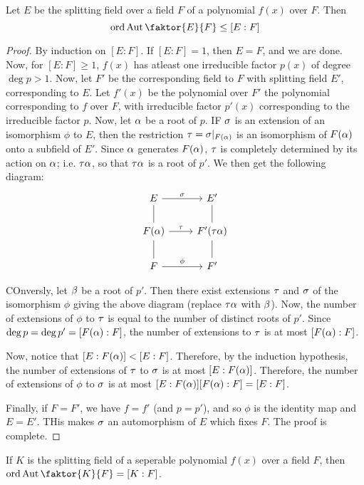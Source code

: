 \begin{proposition}\label{2.1.5}
    Let $E$ be the splitting field over a field $F$ of a polynomial $f(x)$ over
    $F$. Then
    \begin{equation*}
        \ord{\Aut{\faktor{E}{F}}} \leq [E:F]
    \end{equation*}
\end{proposition}
\begin{proof}
    By induction on $[E:F]$. If $[E:F]=1$, then $E=F$, and we are done. Now, for
     $[E:F] \geq 1$, $f(x)$ has atleast one irreducible factor $p(x)$ of degree
     $\deg{p}>1$. Now, let $F'$ be the corresponding field to $F$ with splitting
     field $E'$, corresponding to  $E$. Let  $f'(x)$ be the polynomial over $F'$
     the polynomial corresponding to $f$ over $F$, with irreducible factor
     $p'(x)$ corresponding to the irreducible factor $p$. Now, let  $\alpha$ be a
     root of  $p$. IF  $\sigma$ is an extension of an isomorphism $\phi$ to $E$,
     then the restriction $\tau=\sigma|_{F(\alpha)}$ is an isomorphism of $F(\alpha)$ onto a
     subfield of $E'$. Since $\alpha$ generates $F(\alpha)$, $\tau$ is completely
     determined by its action on  $\alpha$; i.e.  $\tau\alpha$, so that  $\tau\alpha$ is a root
     of  $p'$. We then get the following diagram:
     \[\begin{tikzcd}
        E & {E'} \\
        {F(\alpha)} & {F'(\tau\alpha)} \\ F & {F'}
        \arrow["\sigma", from=1-1, to=1-2]
        \arrow["\tau", from=2-1, to=2-2]
        \arrow["\phi", from=3-1, to=3-2]
        \arrow[no head, from=1-1, to=2-1]
        \arrow[no head, from=2-1, to=3-1]
        \arrow[no head, from=1-2, to=2-2]
        \arrow[no head, from=2-2,to=3-2]
    \end{tikzcd}\]

    COnversly, let  $\beta$ be a root of  $p'$. Then there exist extensions  $\tau$
    and  $\sigma$ of the isomorphism  $\phi$ giving the above diagram  (replace
    $\tau\alpha$ with  $\beta$). Now, the number of extensions of $\phi$ to  $\tau$ is
    equal to the number of distinct roots of  $p'$. Since
    $\deg{p}=\deg{p'}=[F(\alpha):F]$, the number of extensions to $\tau$ is at most
    $[F(\alpha):F]$.

    Now, notice that $[E:F(\alpha)]<[E:F]$. Therefore, by the induction hypothesis,
    the number of extensions of $\tau$ to  $\sigma$ is at most $[E:F(\alpha)]$. Therefore,
    the number of extensions of $\phi$ to  $\sigma$ is at most
    $[E:F(\alpha)][F(\alpha):F]=[E:F]$.

    Finally, if $F=F'$, we have  $f=f'$ (and $p=p'$), and so $\phi$ is the
    identity map and  $E=E'$. THis makes $\sigma$ an automorphism of $E$ which fixes
     $F$. The proof is complete.
\end{proof}
\begin{corollary}
    If $K$ is the splitting field of a seperable polynomial $f(x)$ over a field
    $F$, then $\ord{\Aut{\faktor{K}{F}}}=[K:F]$.
\end{corollary}

